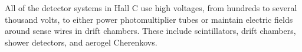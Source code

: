 All of the detector systems in Hall C use high voltages, from hundreds to
several thousand volts, to either power photomultiplier tubes or maintain
electric fields around sense wires in drift chambers.
These include scintillators, drift chambers, shower detectors, and aerogel Cherenkovs.

